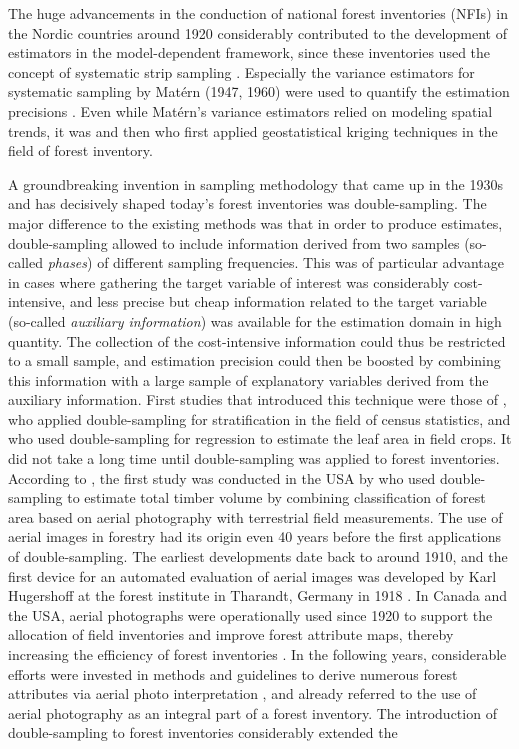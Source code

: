 The huge advancements in the conduction of national forest inventories (NFIs) in the Nordic countries around 1920 considerably contributed to the development of estimators in the model-dependent framework, since these inventories used the concept of systematic strip sampling \citep{kangas2006}. Especially the variance estimators for systematic sampling by Mat\'{e}rn (1947, 1960) were used to quantify the estimation precisions \citep{kangas2006}. Even while Mat\'{e}rn's variance estimators relied on modeling spatial trends, it was \citet{houllier1987} and then \citet{mandallaz1993} who first applied geostatistical kriging techniques in the field of forest inventory.\par

A groundbreaking invention in sampling methodology that came up in the 1930s and has decisively shaped today's forest inventories was double-sampling. The major difference to the existing methods was that in order to produce estimates, double-sampling allowed to include information derived from two samples (so-called \textit{phases}) of different sampling frequencies. This was of particular advantage in cases where gathering the target variable of interest was considerably cost-intensive, and less precise but cheap information related to the target variable (so-called \textit{auxiliary information}) was available for the estimation domain in high quantity. The collection of the cost-intensive information could thus be restricted to a small sample, and estimation precision could then be boosted by combining this information with a large sample of explanatory variables derived from the auxiliary information. First studies that introduced this technique were those of \citet{neyman1938}, who applied double-sampling for stratification in the field of census statistics, and \citet{watson1937} who used double-sampling for regression to estimate the leaf area in field crops. It did not take a long time until double-sampling was applied to forest inventories. According to \citet{kangas2006}, the first study was conducted in the USA by \citet{bickford1952, bickford1953} who used double-sampling to estimate total timber volume by combining classification of forest area based on aerial photography with terrestrial field measurements. The use of aerial images in forestry had its origin even 40 years before the first applications of double-sampling. The earliest developments date back to around 1910, and the first device for an automated evaluation of aerial images was developed by Karl Hugershoff at the forest institute in Tharandt, Germany in 1918 \citep{prager1961}. In Canada and the USA, aerial photographs were operationally used since 1920 to support the allocation of field inventories and improve forest attribute maps, thereby increasing the efficiency of forest inventories \citep{langballe1938}. In the following years, considerable efforts were invested in methods and guidelines to derive numerous forest attributes via aerial photo interpretation \citep[e.g.,][]{hildebrandt1996}, and \citet{zoehrer1980} already referred to the use of aerial photography as an integral part of a forest inventory. The introduction of double-sampling to forest inventories considerably extended the 